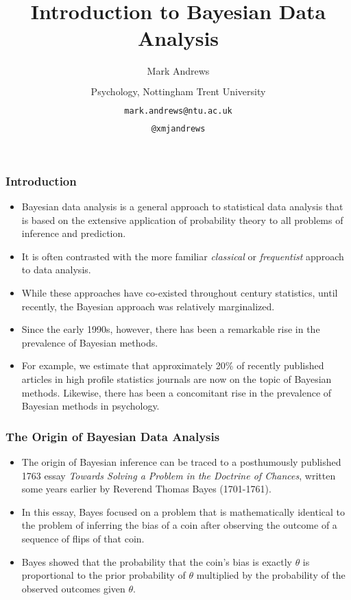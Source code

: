 \documentclass{slides}
\title[Bayesian Inference]{Introduction to Bayesian Data Analysis}
\author[Andrews]{Mark Andrews \\ $\phantom{foo}$ \\ Psychology, Nottingham Trent University \\ $\phantom{foo}$ \\ \texttt{mark.andrews@ntu.ac.uk} \\ $\phantom{foo}$ \\ \faTwitter \texttt{@xmjandrews}}
\date{}
\begin{document}
{
	\begin{frame}
		\titlepage
	\end{frame}
}

\begin{frame}
	\frametitle{Introduction}
	\begin{itemize}

	\item Bayesian data analysis is a general approach to statistical data
		analysis that is based on the extensive application of
		probability theory to all problems of inference and prediction.  

	\item It is often contrasted with the more familiar \emph{classical} or
		\emph{frequentist} approach to data analysis.  

	\item While these approaches have co-existed throughout \nth{20}
		century statistics, until recently, the Bayesian approach was
		relatively marginalized.  

	\item Since the early 1990s, however, there has been a remarkable rise
		in the prevalence of Bayesian methods. 

	\item For example, we estimate that approximately 20\% of recently
		published articles in high profile statistics journals are now
		on the topic of Bayesian methods. Likewise, there has been a
		concomitant rise in the prevalence of Bayesian methods in
		psychology. 
\end{itemize}

\end{frame}



\begin{frame}
	\frametitle{The Origin of Bayesian Data Analysis}
	\begin{itemize}

	\item  The origin of Bayesian inference can be traced to a posthumously published 1763 essay
		\emph{Towards Solving a Problem in the Doctrine of Chances},
		written some years earlier by Reverend Thomas Bayes
		(1701-1761). 

	\item In this essay, Bayes focused on a problem that is mathematically
		identical to the problem of inferring the bias of a coin after
		observing the outcome of a sequence of flips of that coin.  
		
	\item Bayes showed that the probability that the coin's bias is exactly
		$\theta$ is proportional to the prior probability of $\theta$
		multiplied by the probability of the observed outcomes given
		$\theta$.
\end{itemize}
\end{frame}
\end{document}

